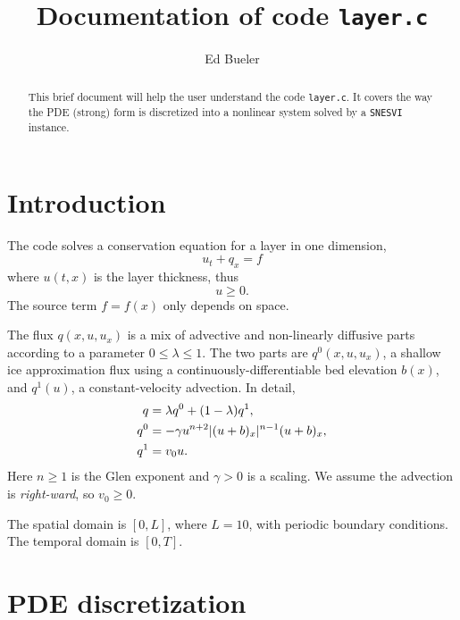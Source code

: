 \documentclass[11pt]{amsart}
\title{Documentation of code \texttt{layer.c}}
\author{Ed Bueler}
\begin{document}
\begin{abstract}
This brief document will help the user understand the code \texttt{layer.c}.  It covers the way the PDE (strong) form is discretized into a nonlinear system solved by a \texttt{SNESVI} instance.
\end{abstract}

\maketitle

\thispagestyle{empty}


\section{Introduction}

The code solves a conservation equation for a layer in one dimension,
\begin{equation}
u_t + q_x = f  \label{eq:conserve}
\end{equation}
where $u(t,x)$ is the layer thickness, thus
\begin{equation}
u \ge 0. \label{eq:constraint}
\end{equation}
The source term $f=f(x)$ only depends on space.

The flux $q(x,u,u_x)$ is a mix of advective and non-linearly diffusive parts according to a parameter $0\le \lambda \le 1$.  The two parts are $q^0(x,u,u_x)$, a shallow ice approximation flux using a continuously-differentiable bed elevation $b(x)$, and $q^1(u)$, a constant-velocity advection.  In detail,
\begin{align}
    q &= \lambda q^0 + (1-\lambda) q^1,  \label{eq:fluxform} \\
  q^0 &= - \gamma u^{n+2} |(u+b)_x|^{n-1} (u+b)_x, \notag \\
  q^1 &= v_0 u. \notag
\end{align}
Here $n\ge 1$ is the Glen exponent and $\gamma>0$ is a scaling.  We assume the advection is \emph{right-ward}, so $v_0 \ge 0$.

The spatial domain is $[0,L]$, where $L=10$, with periodic boundary conditions.  The temporal domain is $[0,T]$.  


\section{PDE discretization}
\end{document}
